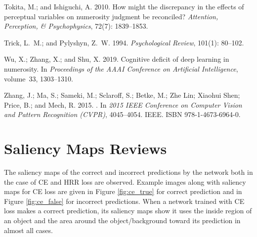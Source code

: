 \documentclass[letterpaper]{article} %
\begin{document}
\begin{thebibliography}{33}
    Tokita, M.; and Ishiguchi, A. 2010.
    \newblock How might the discrepancy in the effects of perceptual variables on
      numerosity judgment be reconciled?
    \newblock \emph{Attention, Perception, \& Psychophysics}, 72(7): 1839--1853.

    Trick, L.~M.; and Pylyshyn, Z.~W. 1994.
    \newblock \emph{Psychological Review}, 101(1): 80--102.

    Wu, X.; Zhang, X.; and Shu, X. 2019.
    \newblock Cognitive deficit of deep learning in numerosity.
    \newblock In \emph{Proceedings of the AAAI Conference on Artificial
      Intelligence}, volume~33, 1303--1310.

    Zhang, J.; Ma, S.; Sameki, M.; Sclaroff, S.; Betke, M.; {Zhe Lin}; {Xiaohui
      Shen}; Price, B.; and Mech, R. 2015.
    .
    \newblock In \emph{2015 IEEE Conference on Computer Vision and Pattern
      Recognition (CVPR)}, 4045--4054. IEEE.
    \newblock ISBN 978-1-4673-6964-0.

\end{thebibliography}


\appendix
\onecolumn


\section{Saliency Maps Reviews} \label{appendix:saliency}
The saliency maps of the correct and incorrect predictions by the network both in the case of CE and HRR loss are observed. Example images along with saliency maps for CE loss are given in Figure \ref{fig:ce_true} for correct prediction and in Figure \ref{fig:ce_false} for incorrect predictions.  When a network trained with CE loss makes a correct prediction, its saliency maps show it uses the inside region of an object and the area around the object/background toward its prediction in almost all cases.
\end{document}
